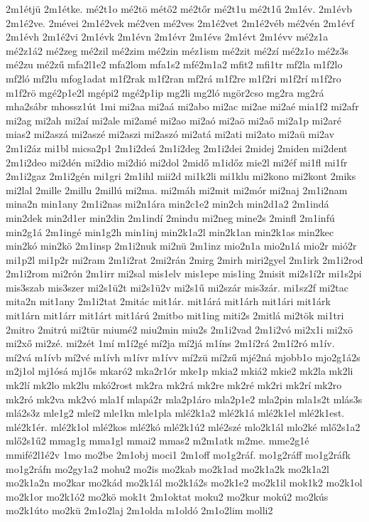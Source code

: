 {2m1étjü
2m1étke.
mé2t1o
mé2tö
métő2
mé2tőr
mé2t1u
mé2t1ű
2m1év.
2m1évb
2m1é2ve.
2mévei
2m1é2vek
mé2ven
mé2ves
2m1é2vet
2m1é2véb
mé2vén
2m1évf
2m1évh
2m1é2vi
2m1évk
2m1évn
2m1évr
2m1évs
2m1évt
2m1évv
mé2z1a
mé2z1á2
mé2zeg
mé2zil
mé2zim
mé2zin
méz1ism
mé2zit
mé2zí
mé2z1o
mé2z3s
mé2zu
mé2zű
mfa2l1e2
mfa2lom
mfa1s2
mfé2m1a2
mfit2
mfi1tr
mf2la
m1f2lo
mf2ló
mf2lu
mfog1adat
m1f2rak
m1f2ran
mf2rá
m1f2re
m1f2ri
m1f2rí
m1f2ro
m1f2rö
mgé2p1e2l
mgépi2
mgé2p1ip
mg2li
mg2ló
mgör2cso
mg2ra
mg2rá
mha2sábr
mhossz1út
1mi
mi2aa
mi2aá
mi2abo
mi2ac
mi2ae
mi2aé
mia1f2
mi2afr
mi2ag
mi2ah
mi2aí
mi2ale
mi2amé
mi2ao
mi2aó
mi2aö
mi2aő
mi2a1p
mi2aré
mias2
mi2aszá
mi2aszé
mi2aszi
mi2aszó
mi2atá
mi2ati
mi2ato
mi2aü
mi2av
2m1i2áz
mi1bl
micsa2p1
2m1i2deá
2m1i2deg
2m1i2dei
2midej
2miden
mi2dent
2m1i2deo
mi2dén
mi2dio
mi2dió
mi2dol
2midő
m1időz
mie2l
mi2éf
mi1fl
mi1fr
2m1i2gaz
2m1i2gén
mi1gri
2m1ihl
mii2d
mi1k2li
mi1klu
mi2kono
mi2kont
2miks
mi2lal
2mille
2millu
2millú
mi2ma.
mi2máh
mi2mit
mi2mór
mi2naj
2m1i2nam
mina2n
min1any
2m1i2nas
mi2n1ára
min2c1e2
min2ch
min2d1a2
2m1indá
min2dek
min2d1er
min2din
2m1indí
2mindu
mi2neg
mine2s
2minfl
2m1infú
min2g1á
2m1ingé
min1g2h
min1inj
min2k1a2l
min2k1an
min2k1as
min2kec
min2kó
min2kö
2m1insp
2m1i2nuk
mi2nü
2m1inz
mio2n1a
mio2n1á
mio2r
mió2r
mi1p2l
mi1p2r
mi2ram
2m1i2rat
2mi2rán
2mirg
2mirh
miri2gyel
2m1irk
2m1i2rod
2m1i2rom
mi2rón
2m1irr
mi2sal
mis1elv
mis1epe
mis1ing
2misit
mi2s1í2r
mi1s2pi
mis3szab
mis3szer
mi2s1ü2t
mi2s1ü2v
mi2s1ű
mi2szár
mis3zár.
mi1sz2f
mi2tac
mita2n
mit1any
2m1i2tat
2mitác
mit1ár.
mit1árá
mit1árh
mit1ári
mit1árk
mit1árn
mit1árr
mit1árt
mit1árú
2mitbo
mit1ing
miti2s
2mitlá
mi2tök
mi1tri
2mitro
2mitrú
mi2tür
miumé2
miu2min
miu2s
2m1i2vad
2m1i2vó
mi2x1i
mi2xö
mi2xő
mi2zé.
mi2zét
1mí
m1í2gé
mí2ja
mí2já
m1íns
2m1í2rá
2m1í2ró
m1ív.
mí2vá
m1ívb
mí2vé
m1ívh
m1ívr
m1ívv
mí2zü
mí2zű
mjé2ná
mjobb1o
mjo2g1á2s
m2j1ol
mj1ósá
mj1ős
mkaró2
mka2r1ór
mke1p
mkia2
mkiá2
mkie2
mk2la
mk2li
mk2lí
mk2lo
mk2lu
mkó2rost
mk2ra
mk2rá
mk2re
mk2ré
mk2ri
mk2rí
mk2ro
mk2ró
mk2va
mk2vó
mla1f
mlapá2r
mla2p1áro
mla2p1e2
mla2pin
mla1s2t
mlás3s
mlá2s3z
mle1g2
mleí2
mle1kn
mle1pla
mlé2k1a2
mlé2k1á
mlé2k1el
mlé2k1est.
mlé2k1ér.
mlé2k1ol
mlé2kos
mlé2kó
mlé2k1ú2
mlé2szé
mlo2k1ál
mlo2ké
mlő2s1a2
mlő2s1ű2
mmag1g
mma1gl
mmai2
mmas2
m2m1atk
m2me.
mme2g1é
mmifé2l1é2v
1mo
mo2be
2m1obj
moci1
2m1off
mo1g2ráf.
mo1g2ráff
mo1g2ráfk
mo1g2ráfn
mo2gy1a2
mohu2
mo2is
mo2kab
mo2k1ad
mo2k1a2k
mo2k1a2l
mo2k1a2n
mo2kar
mo2kád
mo2k1ál
mo2k1á2s
mo2k1e2
mo2k1il
mok1k2
mo2k1ol
mo2k1or
mo2k1ó2
mo2kö
mok1t
2m1oktat
moku2
mo2kur
mokú2
mo2kús
mo2k1úto
mo2kü
2m1o2laj
2m1olda
m1oldó
2m1o2lim
molli2
}
